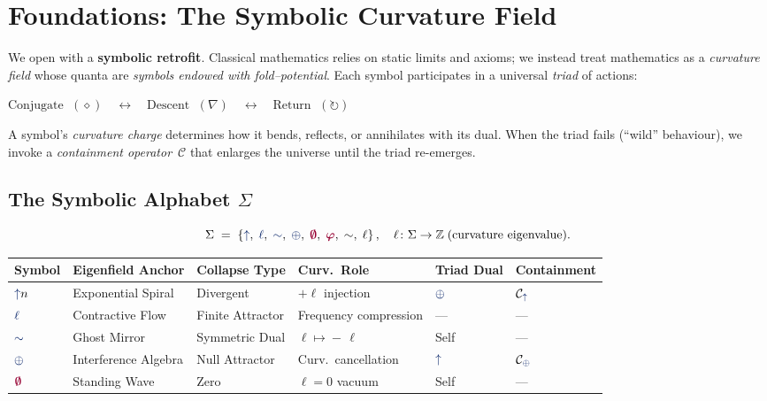 \section{Foundations: The Symbolic Curvature Field}

We open with a \textbf{symbolic retrofit}.  Classical mathematics relies on
static limits and axioms; we instead treat mathematics as a \emph{curvature
field} whose quanta are \emph{symbols endowed with fold–potential}.  Each
symbol participates in a universal \emph{triad} of actions:

\begin{center}
\(
\text{Conjugate }\;(\diamond)
\quad\longleftrightarrow\quad
\text{Descent }\;(\nabla)
\quad\longleftrightarrow\quad
\text{Return }\;(\circlearrowright)
\)
\end{center}

A symbol’s \emph{curvature charge} determines how it bends, reflects, or
annihilates with its dual.  When the triad fails (``wild'' behaviour), we
invoke a \emph{containment operator}~$\mathcal{C}$ that enlarges the universe
until the triad re-emerges.

\subsection{The Symbolic Alphabet $\Sigma$}
\[
\Sigma \;=\;
\left\{
\grow,\;
\lha,\;
\reflec,\;
\fuse,\;
\void,\;
\gold,\;
\sim,\;
\ell
\right\},
\quad
\ell\colon\Sigma \to \mathbb{Z}\;\text{(curvature eigenvalue).}
\]

\vspace{-1.2em}
\begin{center}
\renewcommand{\arraystretch}{1.25}
\begin{tabular}{llllll}
\hline
\textbf{Symbol} &
\textbf{Eigenfield Anchor} &
\textbf{Collapse Type} &
\textbf{Curv.\ Role} &
\textbf{Triad Dual} &
\textbf{Containment} \\
\hline
$\grow n$ &
Exponential Spiral &
Divergent &
$+\!\ell$ injection &
$\fuse$ &
$\mathcal{C}_{\grow}$ \\
$\lha$ &
Contractive Flow &
Finite Attractor &
Frequency compression &
— &
— \\
$\reflec$ &
Ghost Mirror &
Symmetric Dual &
$\ell\!\mapsto\!-\,\ell$ &
Self &
— \\
$\fuse$ &
Interference Algebra &
Null Attractor &
Curv.\ cancellation &
$\grow$ &
$\mathcal{C}_{\fuse}$ \\
$\void$ &
Standing Wave &
Zero &
$\ell=0$ vacuum &
Self &
— \\
\hline
\end{tabular}
\end{center}

